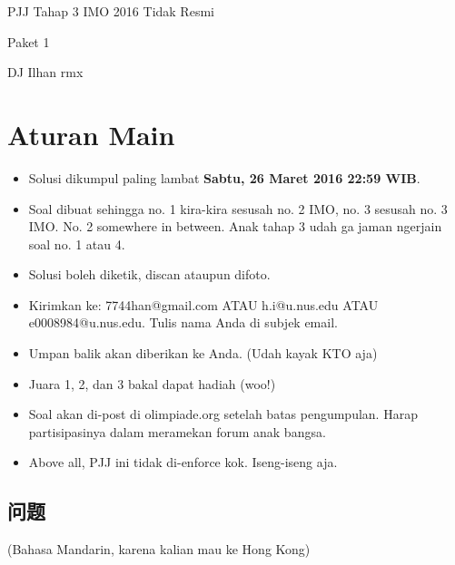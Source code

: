 \documentclass{article}
\begin{document}
	\begin{center}
		{\huge PJJ Tahap 3 IMO 2016 Tidak Resmi}
		
		\vspace{1em}
		
		{\Large Paket 1}
		
		\vspace{1em}
		
		DJ Ilhan rmx
	\end{center}
	\section{Aturan Main}
	\begin{itemize}
		\item Solusi dikumpul paling lambat \textbf{Sabtu, 26 Maret 2016 22:59 WIB}.
		\item Soal dibuat sehingga no. 1 kira-kira sesusah no. 2 IMO, no. 3 sesusah no. 3 IMO. No. 2 somewhere in between. Anak tahap 3 udah ga jaman ngerjain soal no. 1 atau 4.
		\item Solusi boleh diketik, discan ataupun difoto.
		\item Kirimkan ke: 7744han@gmail.com ATAU h.i@u.nus.edu ATAU e0008984@u.nus.edu. Tulis nama Anda di subjek email.
		\item Umpan balik akan diberikan ke Anda. (Udah kayak KTO aja)
		\item Juara 1, 2, dan 3 bakal dapat hadiah (woo!)
		\item Soal akan di-post di olimpiade.org setelah batas pengumpulan. Harap partisipasinya dalam meramekan forum anak bangsa.
		\item Above all, PJJ ini tidak di-enforce kok. Iseng-iseng aja.
	\end{itemize}
	\begin{CJK}{UTF8}{gbsn}
		\section{问题}
 	\end{CJK}
	(Bahasa Mandarin, karena kalian mau ke Hong Kong)
	\vspace{1em}
\end{document}
